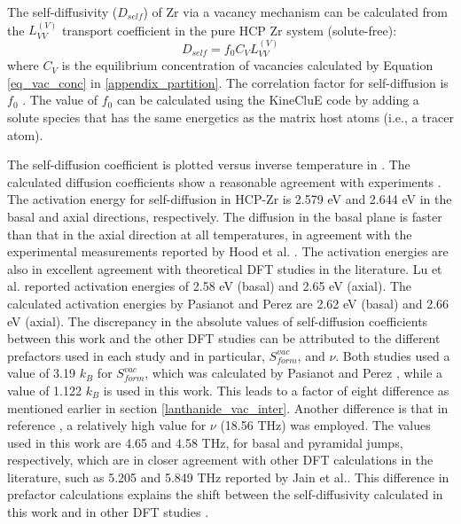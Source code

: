 \documentclass[preprint,12pt]{elsarticle}
\begin{document}
The self-diffusivity ($D_{self}$) of Zr via a vacancy mechanism can be calculated from the $L_{VV}^{(V)}$ transport coefficient in the pure HCP Zr system (solute-free):
\begin{equation}
    D_{self} = f_0 C_V L_{VV}^{(V)}
\end{equation}
where $C_V$ is the equilibrium concentration of vacancies calculated by Equation \ref{eq_vac_conc} in \ref{appendix_partition}. The correlation factor for self-diffusion is $f_0$ \cite{allnatt_atomic_2003}. The value of $f_0$ can be calculated using the KineCluE code
\cite{schuler_kineclue_2020} by adding a solute species that has the same energetics as the matrix host atoms (i.e., a tracer atom).

The self-diffusion coefficient is plotted versus inverse temperature in . The calculated diffusion coefficients show a reasonable agreement with experiments \cite{hood_self-_1997, horvath_anomalous_1984}. The activation energy for self-diffusion in HCP-Zr is 2.579 eV and 2.644 eV in the basal and axial directions, respectively. The diffusion in the basal plane is faster than that in the axial direction at all temperatures, in agreement with the experimental measurements reported by Hood et al. \cite{hood_self-_1997}. The activation energies are also in excellent agreement with theoretical DFT studies in the literature. Lu et al. \cite{lu_first-principles_2018} reported activation energies of 2.58 eV (basal) and 2.65 eV (axial). The calculated activation energies by Pasianot and Perez \cite{pasianot_issues_2012} are 2.62 eV (basal) and 2.66 eV (axial). The discrepancy in the absolute values of self-diffusion coefficients between this work and the other DFT studies \cite{pasianot_issues_2012, lu_first-principles_2018} can be attributed to the different prefactors used in each study and in particular, $S_{form}^{vac}$, and $\nu$. Both studies \cite{pasianot_issues_2012, lu_first-principles_2018} used a value of 3.19 $k_B$ for $S_{form}^{vac}$, which was calculated by Pasianot and Perez \cite{pasianot_issues_2012}, while a value of 1.122 $k_B$ is used in this work. This leads to a factor of eight difference as mentioned earlier in section \ref{lanthanide_vac_inter}. Another difference is that in reference \cite{pasianot_issues_2012}, a relatively high value for $\nu$ (18.56 THz) was employed. The values used in this work are 4.65 and 4.58 THz, for basal and pyramidal jumps, respectively, which are in closer agreement with other DFT calculations in the literature, such as 5.205 and 5.849 THz reported by Jain et al.\cite{jain_first-principles_2019}. This difference in prefactor calculations explains the shift between the self-diffusivity calculated in this work and in other DFT studies \cite{pasianot_issues_2012, lu_first-principles_2018}.
\end{document}
